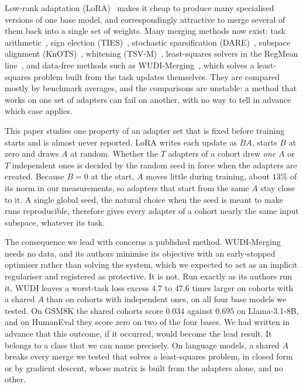 Low-rank adaptation (LoRA)~\citep{hu2022lora} makes it cheap to produce many
specialised versions of one base model, and correspondingly attractive to merge
several of them back into a single set of weights. Many merging methods now
exist: task arithmetic~\citep{ilharco2023task}, sign election
(TIES)~\citep{yadav2023ties}, stochastic sparsification
(DARE)~\citep{yu2024dare}, subspace alignment (KnOTS)~\citep{stoica2025knots},
whitening (TSV-M)~\citep{gargiulo2025tsv}, least-squares solvers in the
RegMean line~\citep{jin2023regmean,tam2024mats}, and data-free methods such as
WUDI-Merging~\citep{cheng2025wudi}, which solves a least-squares problem built
from the task updates themselves. They are compared mostly by benchmark
averages, and the comparisons are unstable: a method that works on one set of
adapters can fail on another, with no way to tell in advance which case
applies.

This paper studies one property of an adapter set that is fixed before
training starts and is almost never reported. LoRA writes each update as $BA$,
starts $B$ at zero and draws $A$ at random. Whether the $T$ adapters of a
cohort drew \emph{one} $A$ or $T$ independent ones is decided by the random
seed in force when the adapters are created. Because $B = 0$ at the start, $A$
moves little during training, about $13\%$ of its norm in our measurements, so
adapters that start from the same $A$ stay close to it. A single global seed,
the natural choice when the seed is meant to make runs reproducible, therefore
gives every adapter of a cohort nearly the same input subspace, whatever its
task.

The consequence we lead with concerns a published method. WUDI-Merging needs
no data, and its authors minimise its objective with an early-stopped
optimiser rather than solving the system, which we expected to act as an
implicit regulariser and registered as protective. It is not. Run exactly as
its authors run it, WUDI leaves a worst-task loss excess $4.7$ to $47.6$ times
larger on cohorts with a shared $A$ than on cohorts with independent ones, on
all four base models we tested. On GSM8K the shared cohorts score $0.034$
against $0.695$ on Llama-3.1-8B, and on HumanEval they score zero on two of the
four bases. We had written in advance that this outcome, if it occurred, would
become the lead result. It belongs to a class that we can name precisely. On
language models, a shared $A$ breaks every merge we tested that solves a
least-squares problem, in closed form or by gradient descent, whose matrix is
built from the adapters alone, and no other.

